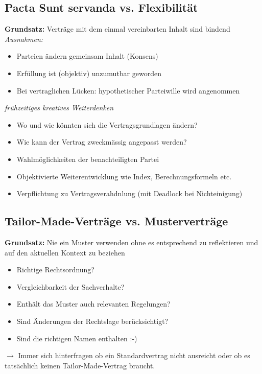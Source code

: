 \documentclass{report}
\theoremstyle{definition}
\theoremstyle{example}
\begin{document}
\subsection{Pacta Sunt servanda vs. Flexibilität}
\textbf{Grundsatz:} Verträge mit dem einmal vereinbarten Inhalt sind bindend\\
\textit{Ausnahmen:}
\begin{itemize}
   \item Parteien ändern gemeinsam Inhalt (Konsens)
   \item Erfüllung ist (objektiv) unzumutbar geworden
   \item Bei vertraglichen Lücken: hypothetischer Parteiwille wird angenommen
\end{itemize}
\textit{frühzeitiges kreatives Weiterdenken}
\begin{itemize}
   \item Wo und wie könnten sich die Vertragsgrundlagen ändern?
   \item Wie kann der Vertrag zweckmässig angepasst werden?
   \item Wahlmöglichkeiten der benachteiligten Partei
   \item Objektivierte Weiterentwicklung wie Index, Berechnungsformeln etc.
   \item Verpflichtung zu Vertragsverahdnlung (mit Deadlock bei Nichteinigung)
\end{itemize}

\subsection{Tailor-Made-Verträge vs. Musterverträge}
\textbf{Grundsatz:} Nie ein Muster verwenden ohne es entsprechend zu reflektieren und auf den aktuellen Kontext zu beziehen
\begin{itemize}
   \item Richtige Rechtsordnung?
   \item Vergleichbarkeit der Sachverhalte?
   \item Enthält das Muster auch relevanten Regelungen?
   \item Sind Änderungen der Rechtslage berücksichtigt?
   \item Sind die richtigen Namen enthalten :-)
\end{itemize}
$\rightarrow$ Immer sich hinterfragen ob ein Standardvertrag nicht ausreicht oder ob es tatsächlich keinen Tailor-Made-Vertrag braucht.
\end{document}
